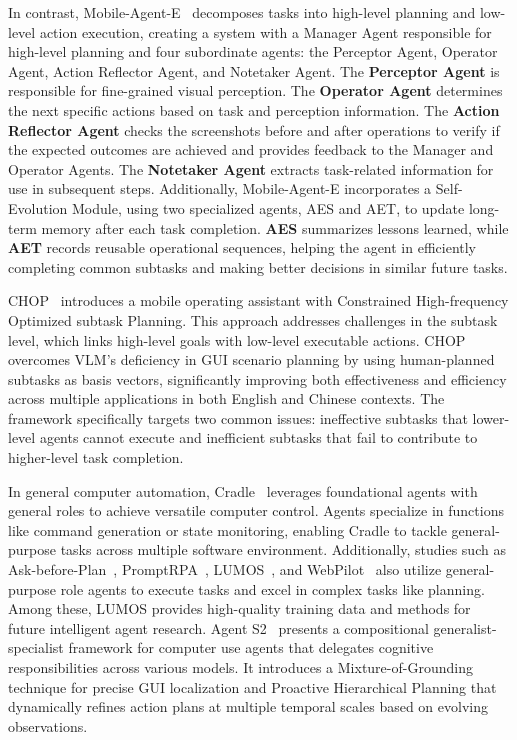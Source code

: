 In contrast, Mobile-Agent-E~\cite{wang2025mobile} decomposes tasks into high-level planning and low-level action execution, creating a system with a Manager Agent responsible for high-level planning and four subordinate agents: the Perceptor Agent, Operator Agent, Action Reflector Agent, and Notetaker Agent. The \textbf{Perceptor Agent} is responsible for fine-grained visual perception. The \textbf{Operator Agent} determines the next specific actions based on task and perception information. The \textbf{Action Reflector Agent} checks the screenshots before and after operations to verify if the expected outcomes are achieved and provides feedback to the Manager and Operator Agents. The \textbf{Notetaker Agent} extracts task-related information for use in subsequent steps. Additionally, Mobile-Agent-E incorporates a Self-Evolution Module, using two specialized agents, AES and AET, to update long-term memory after each task completion. \textbf{AES} summarizes lessons learned, while \textbf{AET} records reusable operational sequences, helping the agent in efficiently completing common subtasks and making better decisions in similar future tasks.

CHOP~\cite{zhou2025chop} introduces a mobile operating assistant with Constrained High-frequency Optimized subtask Planning. This approach addresses challenges in the subtask level, which links high-level goals with low-level executable actions. CHOP overcomes VLM's deficiency in GUI scenario planning by using human-planned subtasks as basis vectors, significantly improving both effectiveness and efficiency across multiple applications in both English and Chinese contexts. The framework specifically targets two common issues: ineffective subtasks that lower-level agents cannot execute and inefficient subtasks that fail to contribute to higher-level task completion.

In general computer automation, Cradle~\cite{tan2024cradle} leverages foundational agents with general roles to achieve versatile computer control. Agents specialize in functions like command generation or state monitoring, enabling Cradle to tackle general-purpose tasks across multiple software environment.
Additionally, studies such as Ask-before-Plan~\cite{zhang2024ask}, PromptRPA~\cite{huang2024promptrpa}, LUMOS~\cite{yin2024agent}, and WebPilot~\cite{zhang2024webpilot} also utilize general-purpose role agents to execute tasks and excel in complex tasks like planning. Among these, LUMOS provides high-quality training data and methods for future intelligent agent research. Agent S2~\cite{agashe2025agent} presents a compositional generalist-specialist framework for computer use agents that delegates cognitive responsibilities across various models. It introduces a Mixture-of-Grounding technique for precise GUI localization and Proactive Hierarchical Planning that dynamically refines action plans at multiple temporal scales based on evolving observations.


